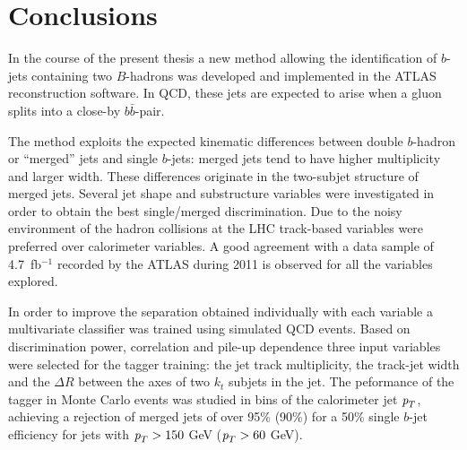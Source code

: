 %
%
\chapter{Conclusions}\label{ch:conclusions}

In the course of the present thesis a new method allowing the identification of $b$-jets containing two $B$-hadrons was developed and implemented in the ATLAS reconstruction software. In QCD, these jets are expected to arise when a gluon splits into a close-by $b\bar{b}$-pair. 


The method exploits the expected kinematic differences between double $b$-hadron or ``merged'' jets and single $b$-jets: merged jets tend to have higher multiplicity and larger width.  These differences originate in the two-subjet structure of merged jets.  Several jet shape and substructure variables were investigated in order to obtain the best single/merged discrimination.  Due to the noisy environment of the hadron collisions at the LHC track-based variables were preferred over calorimeter variables.   A good agreement with a data sample of 4.7~fb$^{-1}$ recorded by the ATLAS during 2011 is observed for all the variables explored.

In order to improve the separation obtained individually with each variable a multivariate classifier was trained using simulated QCD events. Based on discrimination power, correlation and pile-up dependence three input variables were selected for the tagger training: the jet track multiplicity, the track-jet width and the $\Delta R$ between the axes of two $k_t$ subjets in the jet. 
 The peformance of the tagger in Monte Carlo events was studied in bins of the calorimeter jet ${\emph{p}_{T}}$, achieving a rejection of merged jets of over 95\% (90\%) for a 50\% single $b$-jet efficiency for jets with ${\emph{p}_{T}}>150$ GeV (${\emph{p}_{T}}>60$ GeV).



